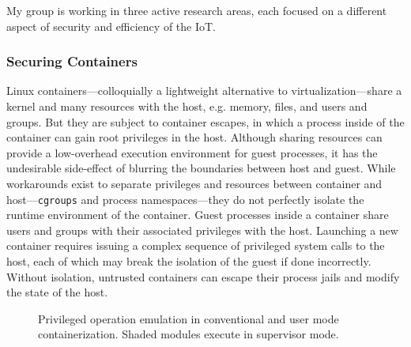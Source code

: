 \documentclass[10pt,onecolumn]{article}
\begin{document}
My group is working in three active research areas, each focused on a different aspect of security and efficiency of the IoT.

\subsubsection{Securing Containers}


Linux containers---colloquially a lightweight alternative to virtualization---share a kernel and many resources with the host, e.g. memory, files, and users and groups.
But they are subject to container escapes, in which a process inside of the container can gain root privileges in the host.
Although sharing resources can provide a low-overhead execution environment for guest processes, it has the undesirable side-effect of blurring the boundaries between host and guest.
While workarounds exist to separate privileges and resources between container and host---\texttt{cgroups} and process namespaces---they do not perfectly isolate the runtime environment of the container.
Guest processes inside a container share users and groups with their associated privileges with the host.
Launching a new container requires issuing a complex sequence of privileged system calls to the host, each of which may break the isolation of the guest if done incorrectly.
Without isolation, untrusted containers can escape their process jails and modify the state of the host.


\begin{figure}[tb]
    \centering
  \caption{Privileged operation emulation in conventional and user mode containerization. Shaded modules execute in supervisor mode.}
  \label{fig:diagram}
\end{figure}
\end{document}
